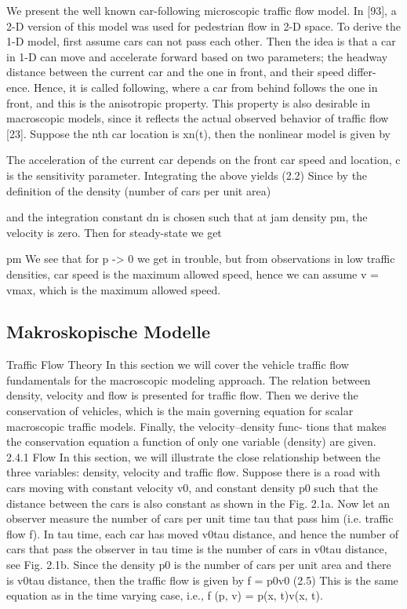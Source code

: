 We present the well known car-following microscopic traffic flow model. In [93], a 2-D version of this model was used for pedestrian flow in 2-D space. To derive the 1-D model, first assume cars can not pass each other. Then the idea is that a car in 1-D can move and accelerate forward based on two parameters; the headway distance between the current car and the one in front, and their speed differ- ence. Hence, it is called following, where a car from behind follows the one in front, and this is the anisotropic property. This property is also desirable in macroscopic models, since it reflects the actual observed behavior of traffic flow [23].
Suppose the nth car location is xn(t), then the nonlinear model is given by

The acceleration of the current car depends on the front car speed and location, c is the sensitivity parameter. Integrating the above yields
 (2.2) Since by the definition of the density (number of cars per unit area)

and the integration constant dn is chosen such that at jam density
pm, the velocity is zero. Then for steady-state we get

pm
We see that for p -> 0 we get in trouble, but from observations in low traffic densities, car speed is the maximum allowed speed, hence we can assume v = vmax, which is the maximum allowed speed.

\subsection*{Makroskopische Modelle}
Traffic Flow Theory
In this section we will cover the vehicle traffic flow fundamentals for the macroscopic modeling approach. The relation between density, velocity and flow is presented for traffic flow. Then we derive the conservation of vehicles, which is the main governing equation for scalar macroscopic traffic models. Finally, the velocity–density func- tions that makes the conservation equation a function of only one variable (density) are given.
2.4.1 Flow
In this section, we will illustrate the close relationship between the three variables: density, velocity and traffic flow. Suppose there is a road with cars moving with constant velocity v0, and constant density p0 such that the distance between the cars is also constant as shown in the Fig. 2.1a. Now let an observer measure the number of cars per unit time tau that pass him (i.e. traffic flow f). In tau time, each car has moved v0tau distance, and hence the number of cars that pass the observer in tau time is the number of cars in v0tau distance, see Fig. 2.1b.
Since the density p0 is the number of cars per unit area and there is v0tau distance, then the traffic flow is given by
f = p0v0 (2.5) This is the same equation as in the time varying case, i.e.,
f (p, v) = p(x, t)v(x, t).

